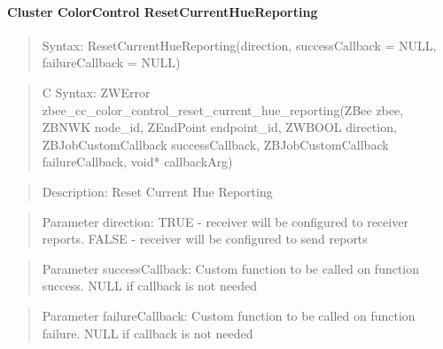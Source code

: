 \paragraph{Cluster ColorControl ResetCurrentHueReporting}
\begin{quote}Syntax: ResetCurrentHueReporting(direction, successCallback = NULL, failureCallback = NULL)\end{quote}
\begin{quote}C Syntax: ZWError zbee\_cc\_color\_control\_reset\_current\_hue\_reporting(ZBee zbee, ZBNWK node\_id, ZEndPoint endpoint\_id, ZWBOOL direction, ZBJobCustomCallback successCallback, ZBJobCustomCallback failureCallback, void* callbackArg)\end{quote}
\begin{quote}Description: Reset Current Hue Reporting\end{quote}
\begin{quote}Parameter direction: TRUE  - receiver will be configured to receiver reports. FALSE - receiver will be configured to send reports\end{quote}
\begin{quote}Parameter successCallback: Custom function to be called on function success. NULL if callback is not needed\end{quote}
\begin{quote}Parameter failureCallback: Custom function to be called on function failure. NULL if callback is not needed\end{quote}


